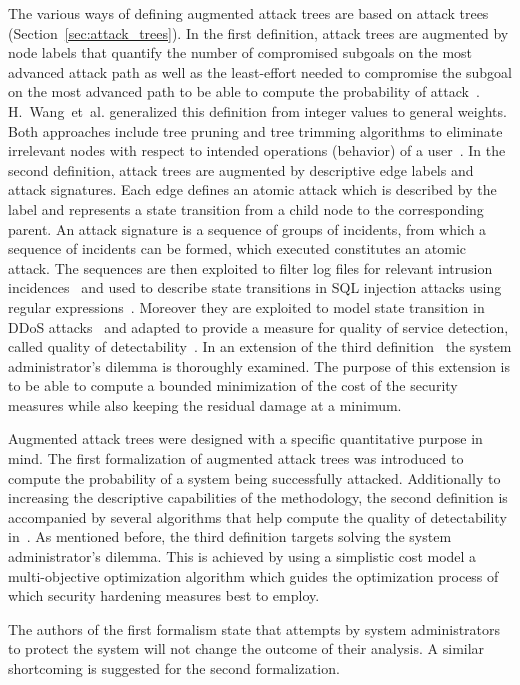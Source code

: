 \documentclass[a4paper]{article}
\begin{document}
The various ways of defining augmented attack trees are based on attack trees
(Section~\ref{sec:attack_trees}). In the first definition, attack trees are
augmented by node labels that quantify the number of compromised subgoals on
the most advanced attack path as well as the least-effort needed to compromise
the subgoal on the most advanced path to be able to compute the probability of
attack~\cite{RaPo}. H.~Wang~et~al. generalized this definition from integer
values to general weights. Both approaches include tree pruning and tree
trimming algorithms to eliminate irrelevant nodes with respect to intended
operations (behavior) of a user~\cite{WaLiZh}. In the second definition,
attack trees are augmented by descriptive edge labels and attack signatures.
Each edge defines an atomic attack which is described by the label and
represents a state transition from a child node to the corresponding parent.
An attack signature is a sequence of groups of incidents, from which a sequence
of incidents can be formed, which executed constitutes an atomic attack.
The sequences are then exploited to filter log files for relevant intrusion
incidences~\cite{PoRa} and used to describe state transitions in SQL injection
attacks using regular expressions~\cite{WaPhWhPa}. Moreover they are exploited
to model state transition in DDoS attacks~\cite{WaPhWhPa3} and adapted to
provide a measure for quality of service detection, called quality of
detectability~\cite{WaPhWhPa2}. In an extension of the third
definition~\cite{DeRaPoWh} the system administrator's dilemma is thoroughly
examined. The purpose of this extension is to be able to compute a bounded
minimization of the cost of the security measures while also keeping the
residual damage at a minimum.

Augmented attack trees were designed with a specific quantitative purpose in
mind. The first formalization of augmented attack trees was introduced to
compute the probability of a system being successfully attacked. Additionally
to increasing the descriptive capabilities of the methodology, the second
definition is accompanied by several algorithms that help compute the quality
of detectability in~\cite{WaPhWhPa2}. As mentioned before, the third
definition targets solving the system administrator's dilemma. This is
achieved by using a simplistic cost model a multi-objective optimization
algorithm which guides the optimization process of which security hardening
measures best to employ.

The authors of the first formalism state that attempts by system
administrators to protect the system will not change the outcome of their
analysis. A similar shortcoming is suggested for the second formalization.
\end{document}
